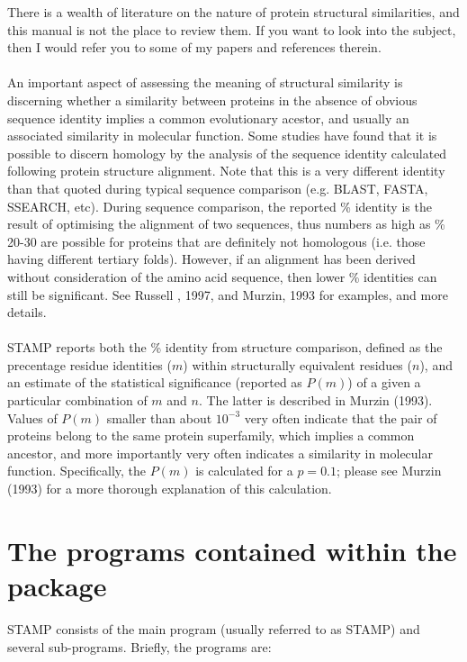 There is a wealth of literature on the nature of protein structural similarities, 
and this manual is not the place to review them.  If you want to look into
the subject, then I would refer you to some of my papers \cite{rb94,russell97b,russell98a}
and references therein.\\
\\
An important aspect of assessing the meaning of structural similarity is discerning whether
a similarity between proteins in the absence of obvious sequence identity implies a common
evolutionary acestor, and usually an associated similarity in molecular function.  Some studies
have found that it is possible to discern homology by the analysis of the sequence identity
calculated following protein structure alignment.  Note that this is a very different 
identity than that quoted during typical sequence comparison (e.g. BLAST, FASTA, SSEARCH, etc).
During sequence comparison, the reported \% identity is the result of optimising the alignment of
two sequences, thus numbers as high as \% 20-30 are possible for proteins that are definitely
not homologous (i.e. those having different tertiary folds).  However, if an alignment has been
derived without consideration of the amino acid sequence, then lower \% identities can still
be significant.  See Russell \ea, 1997, and Murzin, 1993 for examples, and more details.\\ 
\\
\nocite{murzin93}
STAMP reports both the \% identity from structure comparison, defined as the precentage 
residue identities ($m$) within structurally equivalent residues ($n$), and an estimate of the statistical
significance (reported as $P(m)$) of a given a particular combination of $m$ and $n$.  The latter is
described in Murzin (1993).  Values of $P(m)$ smaller than about $10^{-3}$ very often indicate that
the pair of proteins belong to the same protein superfamily, which implies a common
ancestor, and more importantly very often indicates a similarity in molecular function.  Specifically,
the $P(m)$ is calculated for a $p = 0.1$; please see Murzin (1993) for a more thorough explanation
of this calculation.

\section{The programs contained within the package}

STAMP consists of the main program (usually referred to as STAMP)
and several  sub-programs.  Briefly, the programs are:\\


